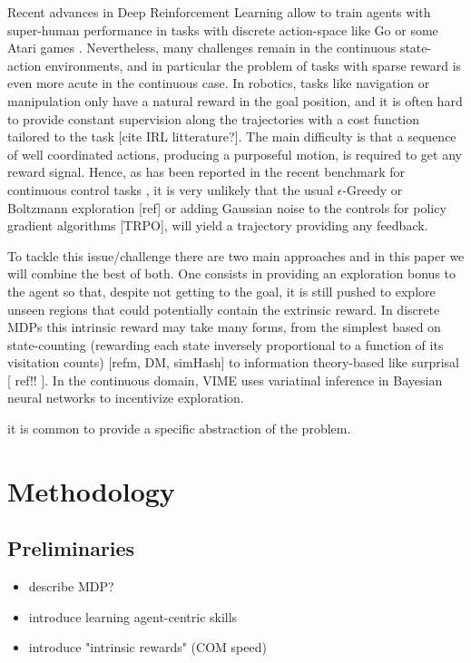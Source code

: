 \documentclass{article} %
\begin{document}
Recent advances in Deep Reinforcement Learning allow to train agents with super-human performance in tasks with discrete action-space like Go \cite{2016go} or some Atari games \cite{mnih2015human}. Nevertheless, many challenges remain in the continuous state-action environments, and in particular the problem of tasks with sparse reward is even more acute in the continuous case. In robotics, tasks like navigation or manipulation only have a natural reward in the goal position, and it is often hard to provide constant supervision along the trajectories with a cost function tailored to the task [cite IRL litterature?]. The main difficulty is that a sequence of well coordinated actions, producing a purposeful motion, is required to get any reward signal. Hence, as has been reported in the recent benchmark for continuous control tasks \cite{yuan2015}, it is very unlikely that the usual $\epsilon$-Greedy or Boltzmann exploration [ref] or adding Gaussian noise to the controls for policy gradient algorithms [TRPO], will yield a trajectory providing any feedback. 

To tackle this issue/challenge there are two main approaches and in this paper we will combine the best of both. One consists in providing an exploration bonus to the agent so that, despite not getting to the goal, it is still pushed to explore unseen regions that could potentially contain the extrinsic reward. In discrete MDPs this intrinsic reward may take many forms, from the simplest based on state-counting (rewarding each state inversely proportional to a function of its visitation counts) [refm, DM, simHash] to information theory-based like surprisal [ ref!! ]. In the continuous domain, VIME uses variatinal inference in Bayesian neural networks to incentivize exploration.

it is common to provide a specific abstraction of the problem.

\section{Methodology}

\subsection{Preliminaries}
\begin{itemize}
    \item describe MDP?
    \item introduce learning agent-centric skills
    \item introduce "intrinsic rewards" (COM speed)
\end{itemize}
\end{document}
